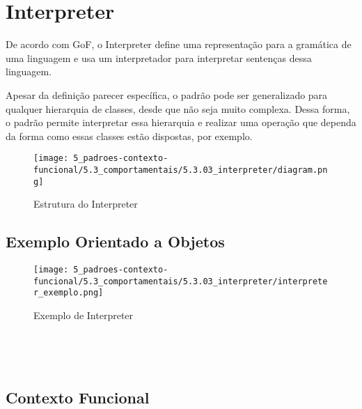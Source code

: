 \section{Interpreter}

De acordo com GoF, o Interpreter define uma representação para 
a gramática de uma linguagem e usa um interpretador para 
interpretar sentenças dessa linguagem.

Apesar da definição parecer específica, o padrão pode ser 
generalizado para qualquer hierarquia de classes, desde que 
não seja muito complexa. Dessa forma, o padrão permite 
interpretar essa hierarquia e realizar uma operação que 
dependa da forma como essas classes estão dispostas, por 
exemplo.

\begin{figure}[htb]
	\caption{\label{interpreter_struct}Estrutura do Interpreter}
	\begin{center}
	    \texttt{[image: 5\_padroes-contexto-funcional/5.3\_comportamentais/5.3.03\_interpreter/diagram.png]}
	\end{center}
\end{figure}

\subsection*{Exemplo Orientado a Objetos}

\begin{figure}[htb]
	\caption{\label{interpreter_exemplo}Exemplo de Interpreter}
	\begin{center}
	    \texttt{[image: 5\_padroes-contexto-funcional/5.3\_comportamentais/5.3.03\_interpreter/interpreter\_exemplo.png]}
	\end{center}
\end{figure}

\begin{lstlisting}[caption={Interpreter Orientação a Objetos},label=oointerpreter]


    
\end{lstlisting}

\subsection*{Contexto Funcional}

\begin{comment}
O próprio GoF cita pattern matching como um exemplo de 
aplicação do padrão Interpreter. Apesar de não ser um 
conceito necessariamente funcional, pattern matching costuma 
ser nativamente implementado por linguagens como Haskell e 
Scala. As linguagens funcionais também costumam implementar 
de forma mais simples tipos algébricos, que são definidos 
quase identicamente às gramáticas usadas para definir 
linguagens. Dessa forma, o que antes necessitaria de diversas 
classes e interfaces para uma hierarquia que não poderia 
ser muito complexa, pode ser traduzido como uma função 
que aproveita o pattern matching naturalmente para decidir 
e interpretar um valor definido através de um tipo abstrato.
\end{comment}

\begin{lstlisting}[caption={Interpreter Funcional},label=fpinterpreter]
    

    
\end{lstlisting}